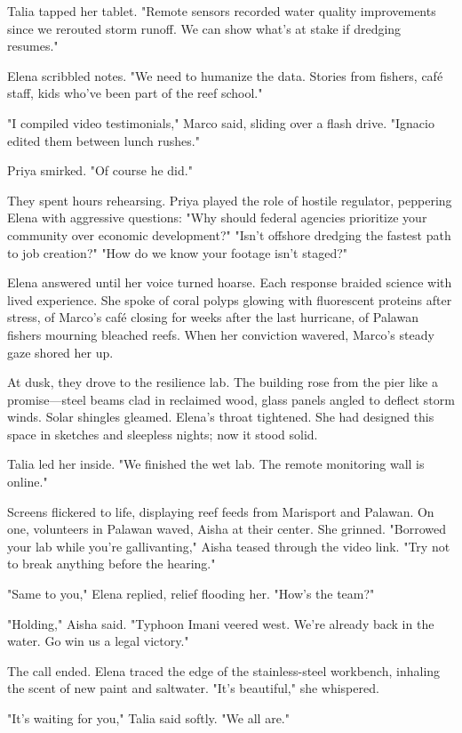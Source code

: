 Talia tapped her tablet. "Remote sensors recorded water quality improvements since we rerouted storm runoff. We can show what's at stake if dredging resumes."

Elena scribbled notes. "We need to humanize the data. Stories from fishers, café staff, kids who've been part of the reef school."

"I compiled video testimonials," Marco said, sliding over a flash drive. "Ignacio edited them between lunch rushes."

Priya smirked. "Of course he did."

They spent hours rehearsing. Priya played the role of hostile regulator, peppering Elena with aggressive questions: "Why should federal agencies prioritize your community over economic development?" "Isn't offshore dredging the fastest path to job creation?" "How do we know your footage isn't staged?"

Elena answered until her voice turned hoarse. Each response braided science with lived experience. She spoke of coral polyps glowing with fluorescent proteins after stress, of Marco's café closing for weeks after the last hurricane, of Palawan fishers mourning bleached reefs. When her conviction wavered, Marco's steady gaze shored her up.

At dusk, they drove to the resilience lab. The building rose from the pier like a promise—steel beams clad in reclaimed wood, glass panels angled to deflect storm winds. Solar shingles gleamed. Elena's throat tightened. She had designed this space in sketches and sleepless nights; now it stood solid.

Talia led her inside. "We finished the wet lab. The remote monitoring wall is online."

Screens flickered to life, displaying reef feeds from Marisport and Palawan. On one, volunteers in Palawan waved, Aisha at their center. She grinned. "Borrowed your lab while you're gallivanting," Aisha teased through the video link. "Try not to break anything before the hearing."

"Same to you," Elena replied, relief flooding her. "How's the team?"

"Holding," Aisha said. "Typhoon Imani veered west. We're already back in the water. Go win us a legal victory."

The call ended. Elena traced the edge of the stainless-steel workbench, inhaling the scent of new paint and saltwater. "It's beautiful," she whispered.

"It's waiting for you," Talia said softly. "We all are."

